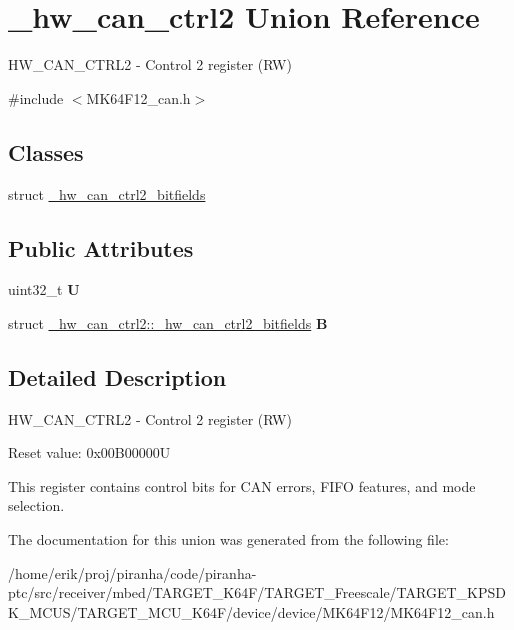 \hypertarget{union__hw__can__ctrl2}{}\section{\+\_\+hw\+\_\+can\+\_\+ctrl2 Union Reference}
\label{union__hw__can__ctrl2}


H\+W\+\_\+\+C\+A\+N\+\_\+\+C\+T\+R\+L2 -\/ Control 2 register (RW)  




{\ttfamily \#include $<$M\+K64\+F12\+\_\+can.\+h$>$}

\subsection*{Classes}
\begin{DoxyCompactItemize}
\item 
struct \hyperlink{struct__hw__can__ctrl2_1_1__hw__can__ctrl2__bitfields}{\+\_\+hw\+\_\+can\+\_\+ctrl2\+\_\+bitfields}
\end{DoxyCompactItemize}
\subsection*{Public Attributes}
\begin{DoxyCompactItemize}
\item 
uint32\+\_\+t {\bfseries U}\hypertarget{union__hw__can__ctrl2_a5309d64c7d9154cdfc0dc4c65e953849}{}\label{union__hw__can__ctrl2_a5309d64c7d9154cdfc0dc4c65e953849}

\item 
struct \hyperlink{struct__hw__can__ctrl2_1_1__hw__can__ctrl2__bitfields}{\+\_\+hw\+\_\+can\+\_\+ctrl2\+::\+\_\+hw\+\_\+can\+\_\+ctrl2\+\_\+bitfields} {\bfseries B}\hypertarget{union__hw__can__ctrl2_a8da6cdfe269a4a56a6e9673230544808}{}\label{union__hw__can__ctrl2_a8da6cdfe269a4a56a6e9673230544808}

\end{DoxyCompactItemize}


\subsection{Detailed Description}
H\+W\+\_\+\+C\+A\+N\+\_\+\+C\+T\+R\+L2 -\/ Control 2 register (RW) 

Reset value\+: 0x00\+B00000U

This register contains control bits for C\+AN errors, F\+I\+FO features, and mode selection. 

The documentation for this union was generated from the following file\+:\begin{DoxyCompactItemize}
\item 
/home/erik/proj/piranha/code/piranha-\/ptc/src/receiver/mbed/\+T\+A\+R\+G\+E\+T\+\_\+\+K64\+F/\+T\+A\+R\+G\+E\+T\+\_\+\+Freescale/\+T\+A\+R\+G\+E\+T\+\_\+\+K\+P\+S\+D\+K\+\_\+\+M\+C\+U\+S/\+T\+A\+R\+G\+E\+T\+\_\+\+M\+C\+U\+\_\+\+K64\+F/device/device/\+M\+K64\+F12/M\+K64\+F12\+\_\+can.\+h\end{DoxyCompactItemize}
